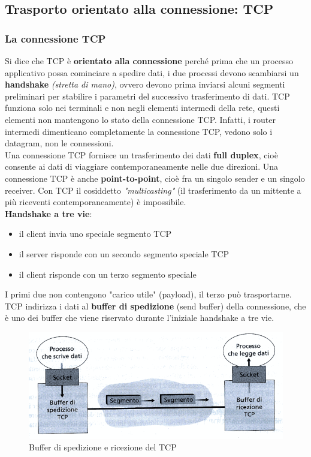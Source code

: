 \documentclass[11pt,a4paper]{article}
\begin{document}
\subsection{Trasporto orientato alla connessione: TCP}
\subsubsection{La connessione TCP}
Si dice che TCP è \textbf{orientato alla connessione} perché prima che un processo applicativo possa cominciare a spedire dati, i due processi devono scambiarsi un \textbf{handshake} \textit{(stretta di mano)}, ovvero devono prima inviarsi alcuni segmenti preliminari per stabilire i parametri del successivo trasferimento di dati.
TCP funziona solo nei terminali e non negli elementi intermedi della rete, questi elementi non mantengono lo stato della connessione TCP. Infatti, i router intermedi dimenticano completamente la connessione TCP, vedono solo i datagram, non le connessioni. \\
Una connessione TCP fornisce un trasferimento dei dati \textbf{full duplex}, cioè consente ai dati di viaggiare contemporaneamente nelle due direzioni. Una connessione TCP è anche \textbf{point-to-point}, cioè fra un singolo sender e un singolo receiver. Con TCP il cosiddetto \emph{"multicasting"} (il trasferimento da un mittente a più riceventi contemporaneamente) è impossibile. \\
\textbf{Handshake a tre vie}:
\begin{itemize}
	\item il client invia uno speciale segmento TCP
	\item il server risponde con un secondo segmento speciale TCP
	\item il client risponde con un terzo segmento speciale
\end{itemize}
I primi due non contengono "carico utile" (payload), il terzo può trasportarne. \\
TCP indirizza i dati al \textbf{buffer di spedizione} (send buffer) della connessione, che è uno dei buffer che viene riservato durante l'iniziale handshake a tre vie.
\begin{figure}
	\includegraphics[scale=0.6]{img/030.png}
	\caption{Buffer di spedizione e ricezione del TCP}
\end{figure}
\end{document}
